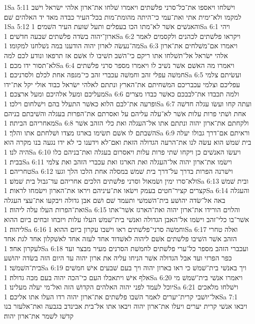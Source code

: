 1Sa 5:11  וישׁלחו ויאספו את־כל־סרני פלשׁתים ויאמרו שׁלחו את־ארון אלהי ישׂראל וישׁב למקמו ולא־ימית אתי ואת־עמי כי־היתה מהומת־מות בכל־העיר כבדה מאד יד האלהים שׁם׃
1Sa 5:12  והאנשׁים אשׁר לא־מתו הכו בעפלים ותעל שׁועת העיר השׁמים׃
1Sa 6:1  ויהי ארון־יהוה בשׂדה פלשׁתים שׁבעה חדשׁים׃
1Sa 6:2  ויקראו פלשׁתים לכהנים ולקסמים לאמר מה־נעשׂה לארון יהוה הודענו במה נשׁלחנו למקומו׃
1Sa 6:3  ויאמרו אם־משׁלחים את־ארון אלהי ישׂראל אל־תשׁלחו אתו ריקם כי־השׁב תשׁיבו לו אשׁם אז תרפאו ונודע לכם למה לא־תסור ידו מכם׃
1Sa 6:4  ויאמרו מה האשׁם אשׁר נשׁיב לו ויאמרו מספר סרני פלשׁתים חמשׁה עפלי זהב וחמשׁה עכברי זהב כי־מגפה אחת לכלם ולסרניכם׃
1Sa 6:5  ועשׂיתם צלמי עפליכם וצלמי עכבריכם המשׁחיתם את־הארץ ונתתם לאלהי ישׂראל כבוד אולי יקל את־ידו מעליכם ומעל אלהיכם ומעל ארצכם׃
1Sa 6:6  ולמה תכבדו את־לבבכם כאשׁר כבדו מצרים ופרעה את־לבם הלוא כאשׁר התעלל בהם וישׁלחום וילכו׃
1Sa 6:7  ועתה קחו ועשׂו עגלה חדשׁה אחת ושׁתי פרות עלות אשׁר לא־עלה עליהם על ואסרתם את־הפרות בעגלה והשׁיבתם בניהם מאחריהם הביתה׃
1Sa 6:8  ולקחתם את־ארון יהוה ונתתם אתו אל־העגלה ואת כלי הזהב אשׁר השׁבתם לו אשׁם תשׂימו בארגז מצדו ושׁלחתם אתו והלך׃
1Sa 6:9  וראיתם אם־דרך גבולו יעלה בית שׁמשׁ הוא עשׂה לנו את־הרעה הגדולה הזאת ואם־לא וידענו כי לא ידו נגעה בנו מקרה הוא היה לנו׃
1Sa 6:10  ויעשׂו האנשׁים כן ויקחו שׁתי פרות עלות ויאסרום בעגלה ואת־בניהם כלו בבית׃
1Sa 6:11  וישׂמו את־ארון יהוה אל־העגלה ואת הארגז ואת עכברי הזהב ואת צלמי טחריהם׃
1Sa 6:12  וישׁרנה הפרות בדרך על־דרך בית שׁמשׁ במסלה אחת הלכו הלך וגעו ולא־סרו ימין ושׂמאול וסרני פלשׁתים הלכים אחריהם עד־גבול בית שׁמשׁ׃
1Sa 6:13  ובית שׁמשׁ קצרים קציר־חטים בעמק וישׂאו את־עיניהם ויראו את־הארון וישׂמחו לראות׃
1Sa 6:14  והעגלה באה אל־שׂדה יהושׁע בית־השׁמשׁי ותעמד שׁם ושׁם אבן גדולה ויבקעו את־עצי העגלה ואת־הפרות העלו עלה ליהוה׃
1Sa 6:15  והלוים הורידו את־ארון יהוה ואת־הארגז אשׁר־אתו אשׁר־בו כלי־זהב וישׂמו אל־האבן הגדולה ואנשׁי בית־שׁמשׁ העלו עלות ויזבחו זבחים ביום ההוא ליהוה׃
1Sa 6:16  וחמשׁה סרני־פלשׁתים ראו וישׁבו עקרון ביום ההוא׃
1Sa 6:17  ואלה טחרי הזהב אשׁר השׁיבו פלשׁתים אשׁם ליהוה לאשׁדוד אחד לעזה אחד לאשׁקלון אחד לגת אחד לעקרון אחד׃
1Sa 6:18  ועכברי הזהב מספר כל־ערי פלשׁתים לחמשׁת הסרנים מעיר מבצר ועד כפר הפרזי ועד אבל הגדולה אשׁר הניחו עליה את ארון יהוה עד היום הזה בשׂדה יהושׁע בית־השׁמשׁי׃
1Sa 6:19  ויך באנשׁי בית־שׁמשׁ כי ראו בארון יהוה ויך בעם שׁבעים אישׁ חמשׁים אלף אישׁ ויתאבלו העם כי־הכה יהוה בעם מכה גדולה׃
1Sa 6:20  ויאמרו אנשׁי בית־שׁמשׁ מי יוכל לעמד לפני יהוה האלהים הקדושׁ הזה ואל־מי יעלה מעלינו׃
1Sa 6:21  וישׁלחו מלאכים אל־יושׁבי קרית־יערים לאמר השׁבו פלשׁתים את־ארון יהוה רדו העלו אתו אליכם׃
1Sa 7:1  ויבאו אנשׁי קרית יערים ויעלו את־ארון יהוה ויבאו אתו אל־בית אבינדב בגבעה ואת־אלעזר בנו קדשׁו לשׁמר את־ארון יהוה׃
